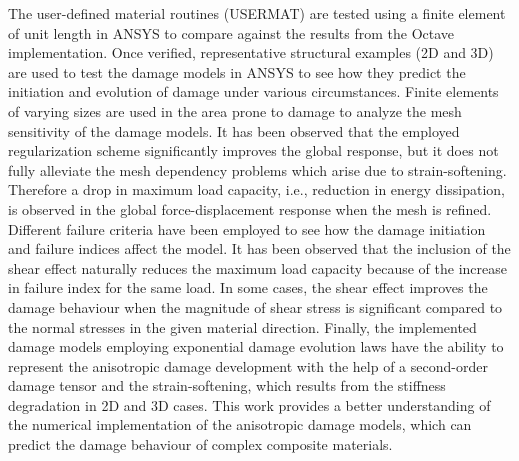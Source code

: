\documentclass[12pt,a4paper,twoside,openright]{report}
\begin{document}
\indent\indent\indent The user-defined material routines (USERMAT) are tested using a finite element of unit length in ANSYS to compare against the results from the Octave implementation. Once verified, representative structural examples (2D and 3D) are used to test the damage models in ANSYS to see how they predict the initiation and evolution of damage under various circumstances. Finite elements of varying sizes are used in the area prone to damage to analyze the mesh sensitivity of the damage models. It has been observed that the employed regularization scheme significantly improves the global response, but it does not fully alleviate the mesh dependency problems which arise due to strain-softening. Therefore a drop in maximum load capacity, i.e., reduction in energy dissipation, is observed in the global force-displacement response when the mesh is refined. Different failure criteria have been employed to see how the damage initiation and failure indices affect the model. It has been observed that the inclusion of the shear effect naturally reduces the maximum load capacity because of the increase in failure index for the same load. In some cases, the shear effect improves the damage behaviour when the magnitude of shear stress is significant compared to the normal stresses in the given material direction. Finally, the implemented damage models employing exponential damage evolution laws have the ability to represent the anisotropic damage development with the help of a second-order damage tensor and the strain-softening, which results from the stiffness degradation in 2D and 3D cases. This work provides a better understanding of the numerical implementation of the anisotropic damage models, which can predict the damage behaviour of complex composite materials.\\
\end{document}
